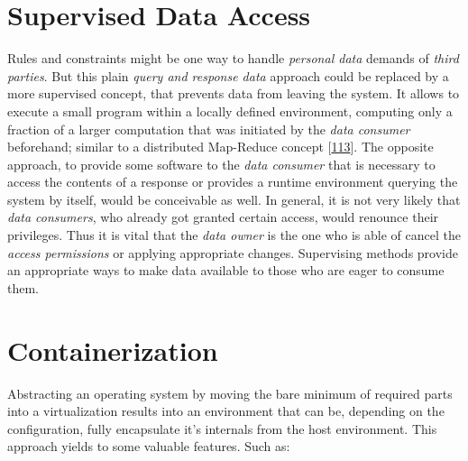 \documentclass[12pt,english,a4paper,titlepage,cleardoublepage=empty,dottedtoc]{report}
\begin{document}
\hypertarget{supervised-data-access}{\section{Supervised Data
Access}\label{supervised-data-access}}

Rules and constraints might be one way to handle \emph{personal data}
demands of \emph{third parties}. But this plain \emph{query and response
data} approach could be replaced by a more supervised concept, that
prevents data from leaving the system. It allows to execute a small
program within a locally defined environment, computing only a fraction
of a larger computation that was initiated by the \emph{data consumer}
beforehand; similar to a distributed Map-Reduce concept
{[}\protect\hyperlink{ref-paper_2004_distributed-mapreduce}{113}{]}. The
opposite approach, to provide some software to the \emph{data consumer}
that is necessary to access the contents of a response or provides a
runtime environment querying the system by itself, would be conceivable
as well. In general, it is not very likely that \emph{data consumers},
who already got granted certain access, would renounce their privileges.
Thus it is vital that the \emph{data owner} is the one who is able of
cancel the \emph{access permissions} or applying appropriate changes.
Supervising methods provide an appropriate ways to make data available
to those who are eager to consume them.

\section{Containerization}\label{containerization}

Abstracting an operating system by moving the bare minimum of required
parts into a virtualization results into an environment that can be,
depending on the configuration, fully encapsulate it's internals from
the host environment. This approach yields to some valuable features.
Such as:
\end{document}
